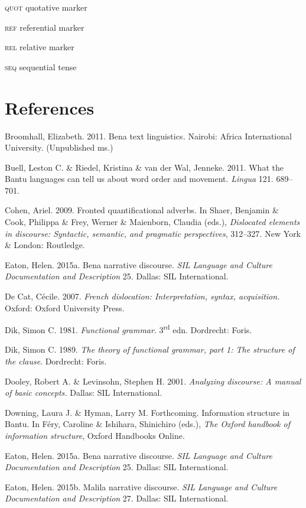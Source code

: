 \documentclass[output=paper]{langsci/langscibook}
\begin{document}
\textsc{quot}  quotative marker

\textsc{ref}   referential marker

\textsc{rel}  relative marker

\textsc{seq}  sequential tense

\section*{References}

Broomhall, Elizabeth. 2011. Bena text linguistics\textit{.} Nairobi: Africa International University. (Unpublished ms.)

Buell, Leston C. \& Riedel, Kristina \& van der Wal, Jenneke. 2011. What the Bantu languages can tell us about word order and movement. \textit{Lingua} 121. 689–701.

Cohen, Ariel. 2009. Fronted quantificational adverbs. In Shaer, Benjamin \& Cook, Philippa \& Frey, Werner \& Maienborn, Claudia (eds.), \textit{Dislocated elements in discourse: Syntactic, semantic, and pragmatic perspectives}, 312–327\textit{.} New York \& London: Routledge.

Eaton, Helen. 2015a. Bena narrative discourse. \textit{SIL Language and Culture Documentation and Description} 25. Dallas: SIL International.

De Cat, Cécile. 2007. \textit{French dislocation: Interpretation, syntax, acquisition.} Oxford: Oxford University Press.

Dik, Simon C. 1981. \textit{Functional grammar}. 3\textsuperscript{rd} edn. Dordrecht: Foris.

Dik, Simon C. 1989. \textit{The theory of functional grammar, part 1: The structure of the clause}. Dordrecht: Foris.

Dooley, Robert A. \& Levinsohn, Stephen H. 2001. \textit{Analyzing discourse: A manual of basic concepts.} Dallas: SIL International.

Downing, Laura J. \& Hyman, Larry M. Forthcoming. Information structure in Bantu. In Féry, Caroline \& Ishihara, Shinichiro (eds.), \textit{The Oxford handbook of information structure}, Oxford Handbooks Online.

Eaton, Helen. 2015a. Bena narrative discourse. \textit{SIL Language and Culture Documentation and Description} 25. Dallas: SIL International.

Eaton, Helen. 2015b. Malila narrative discourse. \textit{SIL Language and Culture Documentation and Description} 27. Dallas: SIL International.
\end{document}
